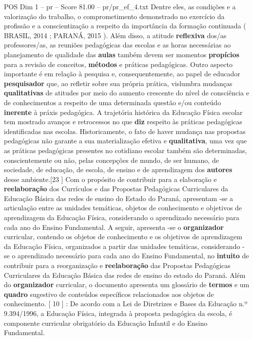 \begin{textsample}{POS Dim 1 – pr – Score 81.00 – pr/pr\_ef\_4.txt}
Dentre eles, as condições e a valorização do trabalho, o comprometimento demonstrado no exercício da profissão e a conscientização a respeito da importância da formação continuada ( BRASIL, 2014 ; PARANÁ, 2015 ).
Além disso, a atitude \textbf{reflexiva} dos/as professores/as, as reuniões pedagógicas das escolas e as horas necessárias ao planejamento de qualidade das \textbf{aulas} também devem ser momentos \textbf{propícios} para a revisão de conceitos, \textbf{métodos} e práticas pedagógicas.
Outro aspecto importante é em relação à pesquisa e, consequentemente, ao papel de educador \textbf{pesquisador} que, ao refletir sobre sua própria prática, vislumbra mudanças \textbf{qualitativas} de atitudes por meio do aumento crescente do nível de consciência e de conhecimentos a respeito de uma determinada questão e/ou conteúdo \textbf{inerente} à práxis pedagógica.
A trajetória histórica da Educação Física escolar tem mostrado avanços e retrocessos no que \textbf{diz} respeito às práticas pedagógicas identificadas nas escolas.
Historicamente, o fato de haver mudança nas propostas pedagógicas não garante a sua materialização efetiva e \textbf{qualitativa}, uma vez que as práticas pedagógicas presentes no cotidiano escolar também são determinadas, conscientemente ou não, pelas concepções de mundo, de ser humano, de sociedade, de educação, de escola, de ensino e de aprendizagem dos \textbf{autores} desse ambiente.[23 ] Com o propósito de contribuir para a elaboração e \textbf{reelaboração} dos Currículos e das Propostas Pedagógicas Curriculares da Educação Básica das redes de ensino do Estado do Paraná, apresentam -se a articulação entre as unidades temáticas, objetos de conhecimento e objetivos de aprendizagem da Educação Física, considerando o aprendizado necessário para cada ano do Ensino Fundamental.
A seguir, apresenta -se o \textbf{organizador} curricular, contendo os objetos de conhecimento e os objetivos de aprendizagem da Educação Física, organizados a partir das unidades temáticas, considerando -se o aprendizado necessário para cada ano do Ensino Fundamental, no \textbf{intuito} de contribuir para a reorganização e \textbf{reelaboração} das Propostas Pedagógicas Curriculares da Educação Básica das redes de ensino do estado do Paraná.
Além do \textbf{organizador} curricular, o documento apresenta um glossário de \textbf{termos} e um \textbf{quadro} sugestivo de conteúdos específicos relacionados aos objetos de conhecimento. [ 10 ] : De acordo com a Lei de Diretrizes e Bases da Educação n.º 9.394/1996, a Educação Física, integrada à proposta pedagógica da escola, é componente curricular obrigatório da Educação Infantil e do Ensino Fundamental.

\end{textsample}
